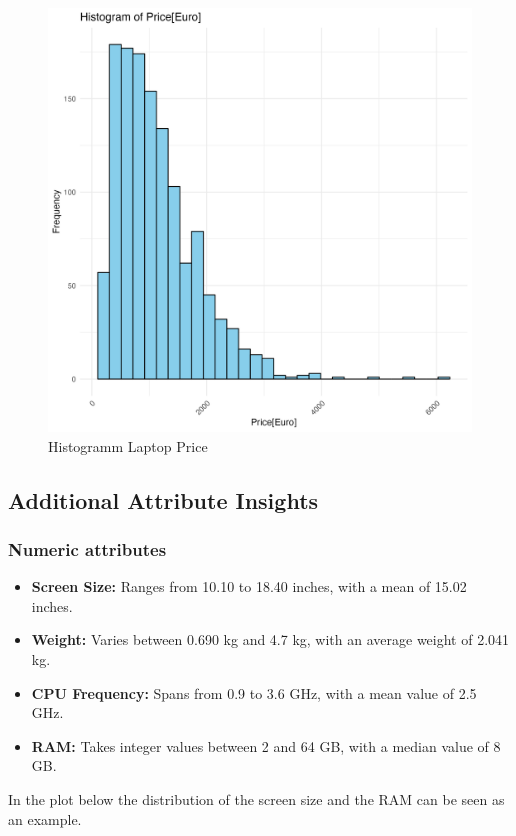 \documentclass{article}
\begin{document}
\begin{figure}[H]
\centering
\includegraphics[width=0.5\linewidth]{Histogram_Price.png}
\caption{\label{fig:hist:price}Histogramm Laptop Price}
\end{figure}

\subsection{Additional Attribute Insights}
\subsubsection{Numeric attributes}

\begin{itemize}
    \item \textbf{Screen Size:} Ranges from 10.10 to 18.40 inches, with a mean of 15.02 inches.
    \item \textbf{Weight:} Varies between 0.690 kg and 4.7 kg, with an average weight of 2.041 kg.
    \item \textbf{CPU Frequency:} Spans from 0.9 to 3.6 GHz, with a mean value of 2.5 GHz.
    \item \textbf{RAM:} Takes integer values between 2 and 64 GB, with a median value of 8 GB.
\end{itemize}

In the plot below the distribution of the screen size and the RAM can be seen as an example.
\end{document}
